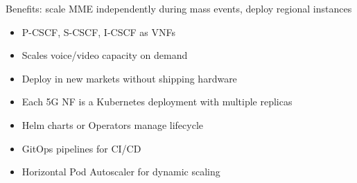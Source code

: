 Benefits: scale MME independently during mass events, deploy regional instances


\begin{itemize}
\tightlist
\item
  P-CSCF, S-CSCF, I-CSCF as VNFs
\item
  Scales voice/\allowbreak{}video capacity on demand
\item
  Deploy in new markets without shipping hardware
\end{itemize}




\begin{itemize}
\tightlist
\item
  Each 5G NF is a Kubernetes deployment with multiple replicas
\item
  Helm charts or Operators manage lifecycle
\item
  GitOps pipelines for CI/\allowbreak{}CD
\item
  Horizontal Pod Autoscaler for dynamic scaling
\end{itemize}





